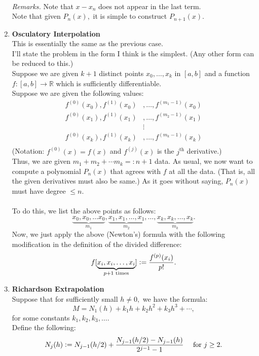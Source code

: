 \documentclass[12pt]{article}
\theoremstyle{definition}
\begin{document}
\begin{enumerate}
\begin{align*}
	\end{align*}
	\emph{Remarks.} Note that $x - x_n$ does not appear in the last term.\\
	Note that given $P_n(x),$ it is simple to construct $P_{n+1}(x).$
	\item \textbf{Osculatory Interpolation}\\
	This is essentially the same as the previous case. \\
	I'll state the problem in the form I think is the simplest. (Any other form can be reduced to this.)\\
	Suppose we are given $k+1$ distinct points $x_0, \ldots, x_k$ in $[a, b]$ and a function $f:[a, b] \to \mathbb{R}$ which is sufficiently differentiable.\\
	Suppose we are given the following values:\\
	\begin{align*} 
		f^{(0)}(x_0), f^{(1)}(x_0)&, \ldots, f^{(m_1-1)}(x_0)\\
		f^{(0)}(x_1), f^{(1)}(x_1)&, \ldots, f^{(m_2-1)}(x_1)\\
		&\vdots\\
		f^{(0)}(x_k), f^{(1)}(x_k)&, \ldots, f^{(m_k-1)}(x_k)\\
	\end{align*}
	(Notation: $f^{(0)}(x) = f(x)$ and $f^{(j)}(x)$ is the $j^{\text{th}}$ derivative.)\\
	Thus, we are given $m_1 + m_2 + \cdots m_k =: n+1$ data. As usual, we now want to compute a polynomial $P_n(x)$ that agrees with $f$ at all the data. (That is, all the given derivatives must also be same.) As it goes without saying, $P_n(x)$ must have degree $\le n.$\\~\\
	To do this, we list the above points as follows:
	\[\underbrace{x_0, x_0, \ldots x_0}_{m_1}, \underbrace{x_1, x_1, \ldots, x_1}_{m_2}, \ldots, \underbrace{x_k, x_k, \ldots, x_k}_{m_k}.\]
	Now, we just apply the above (Newton's) formula with the following modification in the definition of the divided difference:
	\[f[\underbrace{x_i, x_i, \ldots, x_i}_{p+1 \text{ times}}] \vcentcolon= \dfrac{f^{(p)}(x_i)}{p!}.\]
	\item \label{rich}\textbf{Richardson Extrapolation}\\
	Suppose that for sufficiently small $h \neq 0,$ we have the formula:
	\[M = N_1(h) + k_1h + k_2h^2 + k_3h^3 + \cdots,\]
	for some constants $k_1, k_2, k_3,\ldots.$\\
	Define the following:
	\[N_j(h) \vcentcolon= N_{j-1}(h/2) + \frac{N_{j-1}(h/2) - N_{j-1}(h)}{2^{j-1} - 1} \quad \text{ for } j \ge 2.\]

\end{enumerate}
\end{document}
